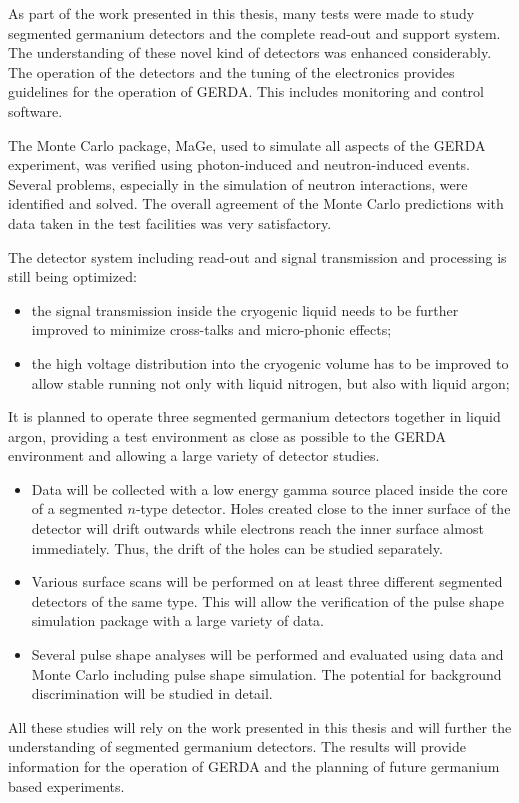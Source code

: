 As part of the work presented in this thesis, many tests were made to study segmented germanium detectors and the complete read-out and support system.  The understanding of these novel kind of detectors was enhanced considerably. The operation of the detectors and the tuning of the electronics provides guidelines for the operation of GERDA. This includes monitoring and control software.

The Monte Carlo package, MaGe, used to simulate all aspects of the GERDA experiment, was verified using photon-induced and neutron-induced events. Several problems, especially in the simulation of neutron interactions, were identified and solved. The overall agreement of the Monte Carlo predictions with data taken in the test facilities was very satisfactory.

The detector system including read-out and signal transmission and processing is still being optimized:
\begin{itemize} 
\item the signal transmission inside the cryogenic liquid needs to be further improved to minimize cross-talks and micro-phonic effects;
\item the high voltage distribution into the cryogenic volume has to be improved to allow stable running not only with liquid nitrogen, but also with liquid argon;
\end{itemize}

It is planned to operate three segmented germanium detectors together in liquid argon, providing a test environment as close as possible to the GERDA environment and allowing a large variety of detector studies.

\begin{itemize}
\item Data will be collected with a low energy gamma source placed inside the core of a segmented $n$-type detector. Holes created close to the inner surface of the detector will drift outwards while electrons reach the inner surface almost immediately.  Thus, the drift of the holes can be studied separately.
\item Various surface scans will be performed on at least three different segmented detectors of the same type. This will allow the verification of the pulse shape simulation package with a large variety of data.
\item Several pulse shape analyses will be performed and evaluated using data and Monte Carlo including pulse shape simulation. The potential for background discrimination will be studied in detail.
\end{itemize} 
 
All these studies will rely on the work presented in this thesis and will further the understanding of segmented germanium detectors. The results will provide information for the operation of GERDA and the planning of future germanium based experiments.
 
